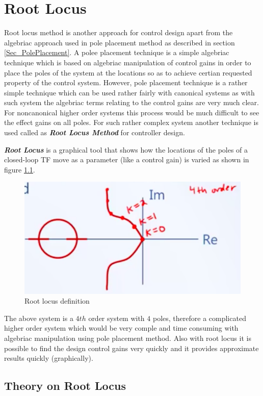 \chapter{Root Locus}

Root locus method is another approach for control design apart from the algebriac approach used in pole placement method as described in section \ref{Sec_PolePlacement}. A polee placement technique is a simple algebriac technique which is based on algebriac manipulation of control gains in order to place the poles of the system at the locations so as to achieve certian requested property of the control system. However, pole placement technique is a rather simple technique which can be used rather fairly with canonical systems as with such system the algebriac terms relating to the control gains are very much clear. For noncanonical higher order systems this process would be much difficult to see the effect gains on all poles. For such rather complex system another technique is used called as \textbf{\textit{Root Locus Method}} for controller design.

\textbf{\textit{Root Locus}} is a graphical tool that shows how the locations of the poles of a closed-loop TF move as a parameter (like a control gain) is varied as shown in figure \ref{RootLocus_Def}.
\begin{figure}[h!]
	\centering
	\includegraphics[width=0.6\linewidth]{Bilder/RootLocus_Def}
	\caption{Root locus definition}
	\label{RootLocus_Def}
\end{figure}
The above system is a $4th$ order system with $4$ poles, therefore a complicated higher order system which would be very comple and time consuming with algebriac manipulation using pole placement method. Also with root locus it is possible to find the design control gains very quickly and it provides approximate results quickly (graphically).

\section{Theory on Root Locus}

